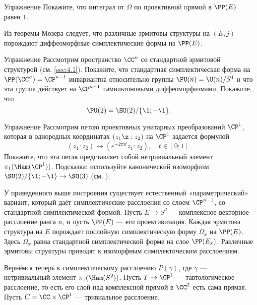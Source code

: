 \begin{thm}{Упражнение}\label{9.2.A}
  Покажите, что интеграл от $\Omega$ по проективной прямой в $\PP(E)$
  равен $1$.
\end{thm}

Из теоремы Мозера \cite{MS} следует, что различные эрмитовы структуры
на $(E, j)$ порождают диффеоморфные симплектические формы на
$\PP(E)$. 

\begin{thm}{Упражнение}\label{9.2.B}
  Рассмотрим пространство $\CC^n$ со стандартной эрмитовой структурой
  (см. \ref{sec:4.1}).
  Покажите, что стандартная симплектическая форма на $\PP(\CC^n ) =
  \CP^{n-1}$ инвариантна относительно группы $\PU (n) = \U (n)/S^1$ и
  что эта группа действует на $\CP^{n-1}$ гамильтоновыми
  диффеоморфизмами.
  Покажите, что 
  \[\PU (2) = \SU (2)/\{\1; -\1\}.\]
\end{thm}
 
\begin{thm}{Упражнение}\label{9.2.C}
  Рассмотрим петлю проективных унитарных преобразований $\CP^1$,
  которая в однородных координатах $(z_1 \z: z_2)$ на $\CP^1$ задается
  формулой
  \[(z_1 : z_2 ) \to (e^{-2\pi it} z_1 : z_2 ),\quad t \in [0; 1].\]
  Покажите, что эта петля представляет собой нетривиальный элемент
  $\pi_1 (\Ham(\CP^1 ))$.
  Подсказка: используйте канонический изоморфизм
  $\SU (2)/\{\1; -\1\}\to \SO(3)$
  (см. \cite{DFN}).  
\end{thm}

У приведенного выше построения существует естественный
«параметрический» вариант, который даёт симплектические расслоения со
слоем $\CP^{n-1}$, со стандартной симплектической формой. 
Пусть $E \to S^2$ --- комплексное векторное расслоение ранга $n$, и
пусть $\PP(E)$ --- его проективизация. 
Каждая эрмитова структура на $E$ порождает послойную симплектическую
форму $\Omega_x$ на $\PP(E)$. 
Здесь $\Omega_x$ равна стандартной симплектической форме на слое
$\PP(E_x)$.
Различные эрмитовы структуры приводят к изоморфным симплектическим
расслоениям. 

Вернёмся теперь к симплектическому расслоению $P(\gamma)$, где
$\gamma$ --- нетривиальный элемент $\pi_1 (\Ham(S^2 ))$. 
Пусть $T \to \CP^1$ --- тавтологическое расслоение,
то есть его слой над комплексной прямой в $\CC^2$ есть сама прямая. 
Пусть $C = \CC \times \CP^1$ --- тривиальное расслоение.
 
